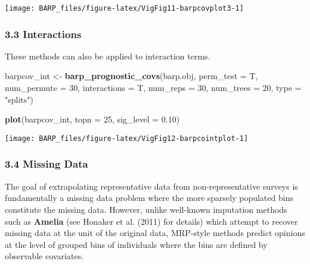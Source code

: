 \documentclass[]{article}
\newenvironment{Shaded}{\begin{snugshade}}{\end{snugshade}}
\newcommand{\KeywordTok}[1]{\textcolor[rgb]{0.13,0.29,0.53}{\textbf{#1}}}
\newcommand{\DataTypeTok}[1]{\textcolor[rgb]{0.13,0.29,0.53}{#1}}
\newcommand{\DecValTok}[1]{\textcolor[rgb]{0.00,0.00,0.81}{#1}}
\newcommand{\FloatTok}[1]{\textcolor[rgb]{0.00,0.00,0.81}{#1}}
\newcommand{\StringTok}[1]{\textcolor[rgb]{0.31,0.60,0.02}{#1}}
\newcommand{\NormalTok}[1]{#1}
\begin{document}
\begin{center}\texttt{[image: BARP\_files/figure-latex/VigFig11-barpcovplot3-1]} \end{center}

\subsubsection{3.3 Interactions}\label{interactions}

These methods can also be applied to interaction terms.

\begin{Shaded}
\begin{Highlighting}[]
\NormalTok{barpcov_int <-}\StringTok{ }\KeywordTok{barp_prognostic_covs}\NormalTok{(barp.obj,}
                                \DataTypeTok{perm_test =}\NormalTok{ T,}
                                \DataTypeTok{num_permute =} \DecValTok{30}\NormalTok{,}
                                \DataTypeTok{interactions =}\NormalTok{ T,}
                                \DataTypeTok{num_reps =} \DecValTok{30}\NormalTok{,}
                                \DataTypeTok{num_trees =} \DecValTok{20}\NormalTok{,}
                                \DataTypeTok{type =} \StringTok{"splits"}\NormalTok{)}
\end{Highlighting}
\end{Shaded}

\begin{Shaded}
\begin{Highlighting}[]
\KeywordTok{plot}\NormalTok{(barpcov_int,}
     \DataTypeTok{topn =} \DecValTok{25}\NormalTok{,}
     \DataTypeTok{sig_level =} \FloatTok{0.10}\NormalTok{)}
\end{Highlighting}
\end{Shaded}

\begin{center}\texttt{[image: BARP\_files/figure-latex/VigFig12-barpcointplot-1]} \end{center}

\subsubsection{3.4 Missing Data}\label{missing-data}

The goal of extrapolating representative data from non-representative
surveys is fundamentally a missing data problem where the more sparsely
populated bins constitute the missing data. However, unlike well-known
imputation methods such as \textbf{Amelia} (see Honaker et al. (2011)
for details) which attempt to recover missing data at the unit of the
original data, MRP-style methods predict opinions at the level of
grouped bins of individuals where the bins are defined by observable
covariates.
\end{document}
